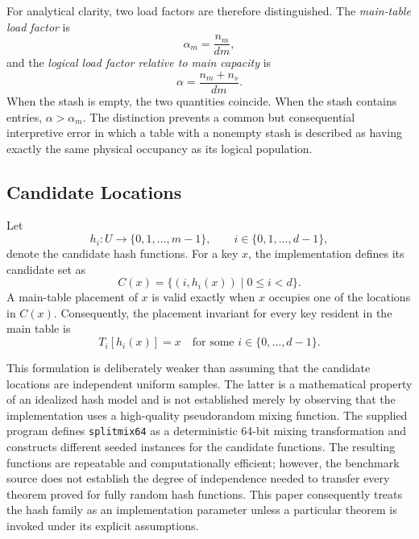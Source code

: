 \documentclass[conference]{IEEEtran}
\begin{document}
For analytical clarity, two load factors are therefore distinguished. The \emph{main-table load factor} is
\begin{equation}
    \alpha_m = \frac{n_m}{dm},
    \label{eq:main-load}
\end{equation}
and the \emph{logical load factor relative to main capacity} is
\begin{equation}
    \alpha = \frac{n_m+n_s}{dm}.
    \label{eq:logical-load}
\end{equation}
When the stash is empty, the two quantities coincide. When the stash contains entries, $\alpha>\alpha_m$. The distinction prevents a common but consequential interpretive error in which a table with a nonempty stash is described as having exactly the same physical occupancy as its logical population.

\subsection{Candidate Locations}

Let
\[
    h_i:U\rightarrow\{0,1,\ldots,m-1\},
    \qquad i\in\{0,1,\ldots,d-1\},
\]
denote the candidate hash functions. For a key $x$, the implementation defines its candidate set as
\begin{equation}
    C(x)=\{(i,h_i(x))\mid 0\le i<d\}.
    \label{eq:candidate-set}
\end{equation}
A main-table placement of $x$ is valid exactly when $x$ occupies one of the locations in $C(x)$. Consequently, the placement invariant for every key resident in the main table is
\begin{equation}
    T_i[h_i(x)] = x
    \quad\text{for some }i\in\{0,\ldots,d-1\}.
    \label{eq:placement-invariant}
\end{equation}

This formulation is deliberately weaker than assuming that the candidate locations are independent uniform samples. The latter is a mathematical property of an idealized hash model and is not established merely by observing that the implementation uses a high-quality pseudorandom mixing function. The supplied program defines
\texttt{splitmix64} as a deterministic 64-bit mixing transformation and constructs different seeded instances for the candidate functions. The resulting functions are repeatable and computationally efficient; however, the benchmark source does not establish the degree of independence needed to transfer every theorem proved for fully random hash functions. This paper consequently treats the hash family as an implementation parameter unless a particular theorem is invoked under its explicit assumptions.
\end{document}
